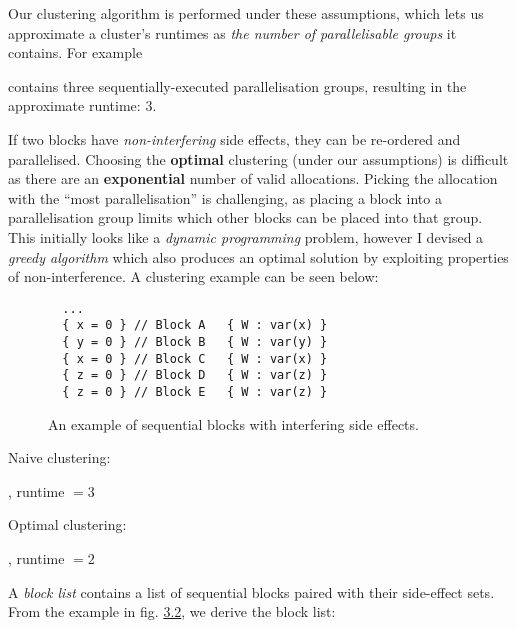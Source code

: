 Our clustering algorithm is performed under these assumptions, which lets us approximate a cluster's runtimes as \textit{the number of parallelisable groups} it contains. For example  contains three sequentially-executed parallelisation groups, resulting in the approximate runtime: \( 3 \).

If two blocks have \textit{non-interfering} side effects, they can be re-ordered and parallelised. Choosing the \textbf{optimal} clustering (under our assumptions) is difficult as there are an \textbf{exponential} number of valid allocations. Picking the allocation with the ``most parallelisation'' is challenging, as placing a block into a parallelisation group limits which other blocks can be placed into that group. This initially looks like a \textit{dynamic programming} problem, however I devised a \textit{greedy algorithm} which also produces an optimal solution by exploiting properties of non-interference. A clustering example can be seen below:

\begin{figure}[!h]
  \begin{verbatim}
  ...
  { x = 0 } // Block A   { W : var(x) }
  { y = 0 } // Block B   { W : var(y) }
  { x = 0 } // Block C   { W : var(x) }
  { z = 0 } // Block D   { W : var(z) }
  { z = 0 } // Block E   { W : var(z) }
\end{verbatim}
  \label{fig:example-blocks}
  \vspace{-4mm}
  \caption{An example of sequential blocks with interfering side effects.}
\end{figure}

\newpage 

Naive clustering: , runtime \(= 3 \)

Optimal clustering: , runtime \(= 2\)

\vspace{3mm}

A \textit{block list} contains a list of sequential blocks paired with their side-effect sets. From the example in fig. \hyperref[fig:example-blocks]{3.2}, we derive the block list:

\vspace{2mm}


\vspace{2mm}

